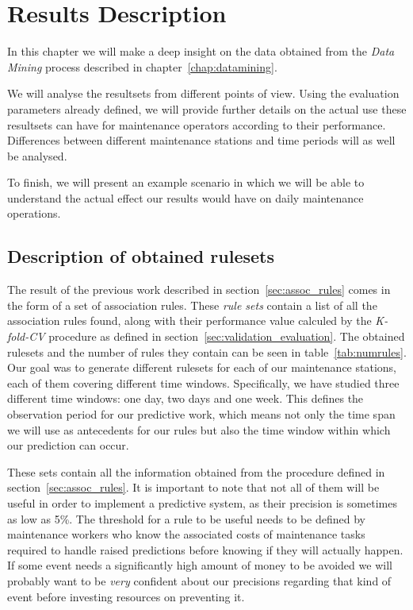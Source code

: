 \chapter{Results Description}
\label{chap:results}
\begin{chapterintro}
In this chapter we will make a deep insight on the data obtained from the \emph{Data Mining} process described in chapter~\ref{chap:datamining}.

We will analyse the resultsets from different points of view. Using the evaluation parameters already defined, we will provide further details on the actual use these resultsets can have for maintenance operators according to their performance. Differences between different maintenance stations and time periods will as well be analysed.

To finish, we will present an example scenario in which we will be able to understand the actual effect our results would have on daily maintenance operations.
\end{chapterintro}
\section{Description of obtained rulesets}
\label{sec:desc_results}
The result of the previous work described in section~\ref{sec:assoc_rules} comes in the form of a set of association rules. These \emph{rule sets} contain a list of all the association rules found, along with their performance value calculed by the \emph{K-fold-CV} procedure as defined in section~\ref{sec:validation_evaluation}. The obtained rulesets and the number of rules they contain can be seen in table~\ref{tab:numrules}. Our goal was to generate different rulesets for each of our maintenance stations, each of them covering different time windows. Specifically, we have studied three different time windows: one day, two days and one week. This defines the observation period for our predictive work, which means not only the time span we will use as antecedents for our rules but also the time window within which our prediction can occur.

These sets contain all the information obtained from the procedure defined in section~\ref{sec:assoc_rules}. It is important to note that not all of them will be useful in order to implement a predictive system, as their precision is sometimes as low as 5\%. The threshold for a rule to be useful needs to be defined by maintenance workers who know the associated costs of maintenance tasks required to handle raised predictions before knowing if they will actually happen. If some event needs a significantly high amount of money to be avoided we will probably want to be \emph{very} confident about our precisions regarding that kind of event before investing resources on preventing it.

